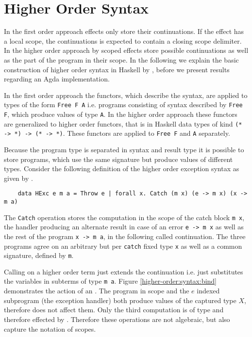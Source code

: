 \section{Higher Order Syntax}
\label{higher-order:syntax}

In the first order approach effects only store their continuations.
If the effect has a local scope, the continuations is expected to contain a
closing scope delimiter.
In the higher order approach by \textcite{DBLP:conf/haskell/WuSH14} scoped
effects store possible continuations as well as the part of the program in their
scope.
In the following we explain the basic construction of higher order syntax in
Haskell by \textcite{DBLP:conf/haskell/WuSH14}, before we present results
regarding an Agda implementation.

In the first order approach the functors, which describe the syntax, are applied
to types of the form \texttt{Free F A} i.e. programs consisting of syntax
described by \texttt{Free F}, which produce values of type \texttt{A}.
In the higher order approach these functors are generalized to higher order
functors, that is in Haskell data types of kind \texttt{(* -> *) -> (* -> *)}.
These functors are applied to \texttt{Free F} and \texttt{A} separately.

Because the program type is separated in syntax and result type it is possible
to store programs, which use the same signature but produce values of different
types.
Consider the following definition of the higher order exception syntax as given
by \textcite{DBLP:conf/haskell/WuSH14}.

\begin{verbatim}
    data HExc e m a = Throw e | forall x. Catch (m x) (e -> m x) (x -> m a)
\end{verbatim}
The \texttt{Catch} operation stores the computation in the scope of the catch
block \texttt{m x}, the handler producing an alternate result in case of an
error \texttt{e -> m x} as well as the rest of the program \texttt{x -> m a}, in
the following called continuation.
The three programs agree on an arbitrary but per \texttt{catch} fixed type
\texttt{x} as well as a common signature, defined by \texttt{m}.

Calling \AgdaFunction{>>=} on a higher order term just extends the continuation
i.e. just substitutes the variables in subterms of type \texttt{m a}.
Figure \ref{higher-order:syntax:bind} demonstrates the action of
\AgdaFunction{>>=} an .
The program in scope and the $e$ indexed subprogram (the exception handler) both
produce values of the captured type $X$, therefore \AgdaFunction{>>=} does not
affect them.
Only the third computation is of type  and therefore effected by
\AgdaFunction{>>=}.
Therefore these operations are not algebraic, but also capture the notation of
scopes.

